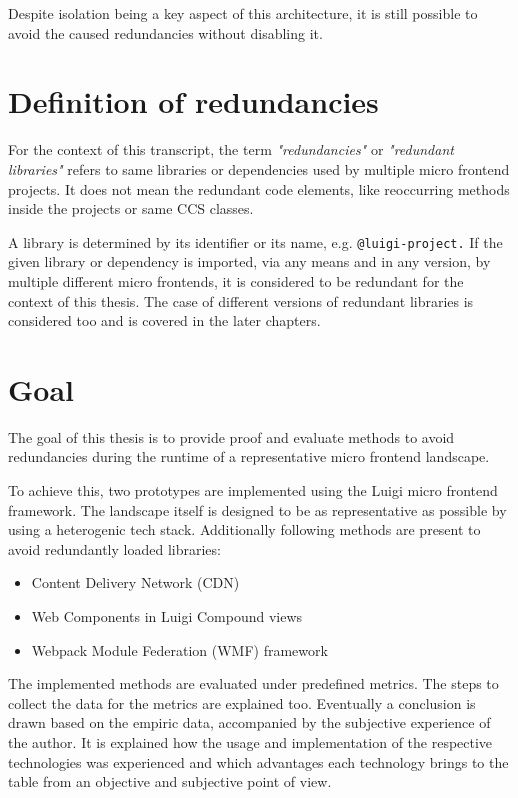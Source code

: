 Despite isolation being a key aspect of this architecture, it is still possible to avoid the caused redundancies without disabling it.

\section{Definition of redundancies}

For the context of this transcript, the term \textit{"redundancies"} or \textit{"redundant libraries"} refers to same libraries or dependencies used by multiple micro frontend projects. It does not mean the redundant code elements, like reoccurring methods inside the projects or same CCS classes. 

A library is determined by its identifier or its name, e.g. \texttt{@luigi-project.} If the given library or dependency is imported, via any means and in any version, by multiple different micro frontends, it is considered to be redundant for the context of this thesis. The case of different versions of redundant libraries is considered too and is covered in the later chapters.

\section{Goal}

The goal of this thesis is to provide proof and evaluate methods to avoid redundancies during the runtime of a representative micro frontend landscape. 

To achieve this, two prototypes are implemented using the Luigi micro frontend framework. The landscape itself is designed to be as representative as possible by using a heterogenic tech stack. Additionally following methods are present to avoid redundantly loaded libraries:

\begin{itemize}
	\item Content Delivery Network (CDN)
	\item Web Components in Luigi Compound views
	\item Webpack Module Federation (WMF) framework
\end{itemize}

The implemented methods are evaluated under predefined metrics. The steps to collect the data for the metrics are explained too.
Eventually a conclusion is drawn based on the empiric data, accompanied by the subjective experience of the author. It is explained how the usage and implementation of the respective technologies was experienced and which advantages each technology brings to the table from an objective and subjective point of view.
  

